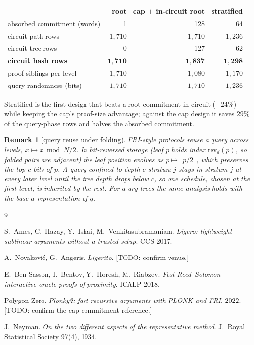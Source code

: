 \documentclass[11pt]{article}
\newcommand{\N}{N}
\newtheorem{remark}[theorem]{Remark}
\theoremstyle{definition}
\begin{document}
\begin{center}
\begin{tabular}{lrrr}
\toprule
& root & cap $+$ in-circuit root & stratified \\
\midrule
absorbed commitment (words) & 1 & 128 & 64 \\
circuit path rows & $1{,}710$ & $1{,}710$ & $1{,}236$ \\
circuit tree rows & 0 & 127 & 62 \\
\textbf{circuit hash rows} & $\mathbf{1{,}710}$ & $\mathbf{1{,}837}$ & $\mathbf{1{,}298}$ \\
proof siblings per level & $1{,}710$ & $1{,}080$ & $1{,}170$ \\
query randomness (bits) & $1{,}710$ & $1{,}710$ & $1{,}236$ \\
\bottomrule
\end{tabular}
\end{center}

Stratified is the first design that beats a root commitment in-circuit
($-24\%$) while keeping the cap's proof-size advantage; against the cap
design it saves $29\%$ of the query-phase rows and halves the absorbed
commitment.

\begin{remark}[query reuse under folding]
FRI-style protocols reuse a query across levels, $x \mapsto x \bmod
\N/2$. In bit-reversed storage (leaf $p$ holds index $\mathrm{rev}_d(p)$,
so folded pairs are adjacent) the leaf position evolves as $p \mapsto
\lfloor p/2 \rfloor$, which preserves the top $c$ bits of $p$. A query
confined to depth-$c$ stratum $j$ stays in stratum $j$ at every later
level until the tree depth drops below $c$, so one schedule, chosen at
the first level, is inherited by the rest. For $a$-ary trees the same
analysis holds with the base-$a$ representation of $q$.
\end{remark}

\begin{thebibliography}{9}\small

S.~Ames, C.~Hazay, Y.~Ishai, M.~Venkitasubramaniam.
\emph{Ligero: lightweight sublinear arguments without a trusted setup}.
CCS 2017.

A.~Novakovi\'c, G.~Angeris. \emph{Ligerito}. [TODO: confirm venue.]

E.~Ben-Sasson, I.~Bentov, Y.~Horesh, M.~Riabzev.
\emph{Fast Reed--Solomon interactive oracle proofs of proximity}.
ICALP 2018.

Polygon Zero. \emph{Plonky2: fast recursive arguments with PLONK and
FRI}. 2022. [TODO: confirm the cap-commitment reference.]

J.~Neyman. \emph{On the two different aspects of the representative
method}. J.\ Royal Statistical Society 97(4), 1934.

\end{thebibliography}
\end{document}
